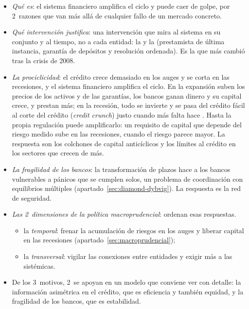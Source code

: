 \documentclass[11pt]{article}
\begin{document}
\begin{itemize}
\item \emph{Qué es}: el sistema financiero amplifica el ciclo y puede caer de golpe, por 2~razones que van más allá de cualquier fallo de un mercado concreto.
\item \emph{Qué intervención justifica}: una intervención que mira al sistema en su conjunto y al tiempo, no a cada entidad: la  y la  (prestamista de última instancia, garantía de depósitos y resolución ordenada). Es la que más cambió tras la crisis de 2008.
\item \emph{La prociclicidad}: el crédito crece demasiado en los auges y se corta en las recesiones, y el sistema financiero amplifica el ciclo. En la expansión suben los precios de los activos y de las garantías, los bancos ganan dinero y su capital crece, y prestan más; en la recesión, todo se invierte y se pasa del crédito fácil al corte del crédito (\emph{credit crunch}) justo cuando más falta hace . Hasta la propia regulación puede amplificarlo: un requisito de capital que depende del riesgo medido sube en las recesiones, cuando el riesgo parece mayor\nocite{KashyapStein2004}. La respuesta son los colchones de capital anticíclicos y los límites al crédito en los sectores que crecen de más.
\item \emph{La fragilidad de los bancos}: la transformación de plazos hace a los bancos vulnerables a pánicos que se cumplen solos, un problema de coordinación con equilibrios múltiples (apartado~\ref{sec:diamond-dybvig}). La respuesta es la red de seguridad.
\item \emph{Las 2~dimensiones de la política macroprudencial}\nocite{Borio2003Macroprudential}: ordenan esas respuestas.
  \begin{itemize}
  \item la \emph{temporal}: frenar la acumulación de riesgos en los auges y liberar capital en las recesiones (apartado~\ref{sec:macroprudencial});
  \item la \emph{transversal}: vigilar las conexiones entre entidades y exigir más a las sistémicas.
  \end{itemize}
\end{itemize}

\begin{itemize}
\item De los 3~motivos, 2~se apoyan en un modelo que conviene ver con detalle: la información asimétrica en el crédito, que es eficiencia y también equidad, y la fragilidad de los bancos, que es estabilidad.
\end{itemize}
\end{document}

